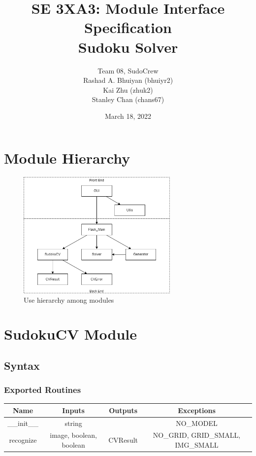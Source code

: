 \documentclass[11pt]{article}
\title{SE 3XA3: Module Interface Specification\\Sudoku Solver}
\author{Team 08, SudoCrew
		\\ Rashad A. Bhuiyan (bhuiyr2)
		\\ Kai Zhu (zhuk2)
		\\ Stanley Chan (chans67)
}
\date{March 18, 2022}
\begin{document}
\maketitle
\tableofcontents
\newpage

\section{Module Hierarchy}
\begin{figure}[H]
\centering
\includegraphics[width=0.7\textwidth]{useHierarchy}
\caption{Use hierarchy among modules}
\label{FigUH}
\end{figure}


\section{SudokuCV Module}

		\subsection{Syntax}
		\subsubsection{Exported Routines}
		\begin{tabular}[width=\textwidth, pos]{|c|c|c|c|}
			
			\hline
			\textbf{Name}& \textbf{Inputs} & \textbf{Outputs} & \textbf{Exceptions} \\ \hline
			\_\_init\_\_ & string &  & NO\_MODEL\\ 
			recognize & image, boolean, boolean & CVResult & NO\_GRID, GRID\_SMALL, IMG\_SMALL\\
			\hline
			
		\end{tabular}
		
\end{document}
